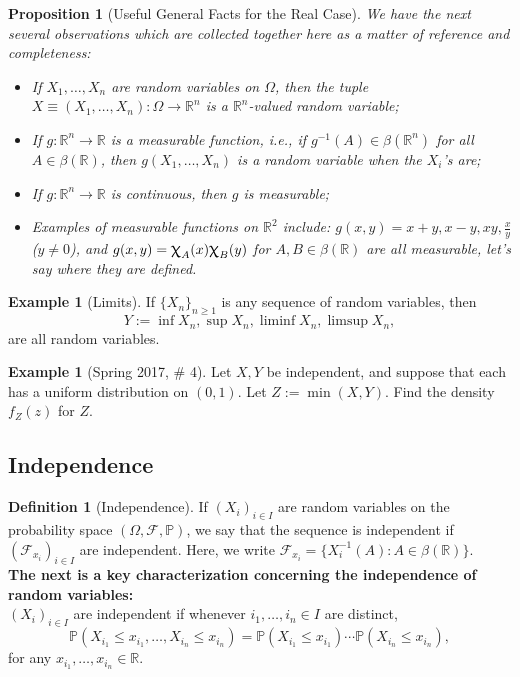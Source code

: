 \documentclass[12pt,reqno]{article}
\theoremstyle{plain}
\newtheorem{prop}[theorem]{Proposition}
\theoremstyle{definition}
\newtheorem{definition}[theorem]{Definition}
\newtheorem{example}[theorem]{Example}
\newcommand{\PP}[1]{\ensuremath{\mathbb{P}\left(#1\right)}}
\renewcommand{\chi}{\scalebox{1.25}{$\upchi$}}
\begin{document}
\begin{prop}[Useful General Facts for the Real Case] 
We have the next several observations which are collected together here as a matter of 
reference and completeness:
\begin{itemize} 

\item[(1)] If $X_1,\ldots,X_n$ are random variables on $\Omega$, then the tuple 
     $X \equiv (X_1,\ldots,X_n): \Omega \rightarrow \mathbb{R}^n$ is a 
     $\mathbb{R}^n$-valued random variable; 
\item[(2)] If $g: \mathbb{R}^n \rightarrow \mathbb{R}$ is a measurable function, i.e., if 
     $g^{-1}(A) \in \beta(\mathbb{R}^n)$ for all $A \in \beta(\mathbb{R})$, then 
     $g(X_1,\ldots,X_n)$ is a random variable when the $X_i$'s are; 
\item[(3)] If $g: \mathbb{R}^n \rightarrow \mathbb{R}$ is continuous, then $g$ is measurable; 
\item[(4)] Examples of measurable functions on $\mathbb{R}^2$ include: 
     $g(x, y) = x+y, x-y, xy, \frac{x}{y}$ ($y \neq 0$), and $g(x, y) = \chi_A(x) \chi_B(y)$ for 
     $A,B \in \beta(\mathbb{R})$ are all measurable, let's say where they are defined. 

\end{itemize} 
\end{prop} 

\begin{example}[Limits] 
If $\{X_n\}_{n \geq 1}$ is any sequence of random variables, then 
$$Y := \inf X_n, \sup X_n, \liminf X_n, \limsup X_n,$$ are all 
random variables. 
\end{example} 

\begin{example}[Spring 2017, \# 4]
Let $X,Y$ be independent, and suppose that each has a uniform distribution 
on $(0,1)$. Let $Z := \min(X, Y)$. Find the density $f_Z(z)$ for $Z$. 
\end{example} 

\subsection{Independence} 

\begin{definition}[Independence] 
If $(X_i)_{i \in I}$ are random variables on the probability space 
$(\Omega, \mathcal{F}, \mathbb{P})$, we say that the sequence is independent 
if $(\mathcal{F}_{x_i})_{i \in I}$ are independent. Here, we write 
$\mathcal{F}_{x_i} = \{X_i^{-1}(A): A \in \beta(\mathbb{R})\}$. \\ 
\textbf{The next is a key characterization concerning the independence of 
random variables:} \\ 
$(X_i)_{i \in I}$ are independent if whenever $i_1,\ldots,i_n \in I$ are 
distinct, 
\[
\PP{X_{i_1} \leq x_{i_1},\ldots,X_{i_n} \leq x_{i_n}} = 
     \PP{X_{i_1} \leq x_{i_1}} \cdots \PP{X_{i_n} \leq x_{i_n}}, 
\]
for any $x_{i_1},\ldots,x_{i_n} \in \mathbb{R}$. 
\end{definition} 
\end{document}
